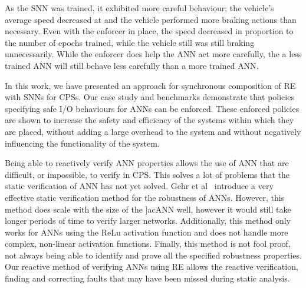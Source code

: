 As the \ac{SNN} was trained, it exhibited more careful behaviour; the vehicle's average speed decreased at and the vehicle performed more braking actions than necessary.
Even with the enforcer in place, the speed decreased in proportion to the number of epochs trained, while the vehicle still was still braking unnecessarily.
While the enforcer does help the \ac{ANN} act more carefully, the a less trained \ac{ANN} will still behave less carefully than a more trained \ac{ANN}.

In this work, we have presented an approach for synchronous composition of \acf{RE} with \acfp{SNN} for \acp{CPS}.
Our case study and benchmarks demonstrate that policies specifying safe I/O behaviours for \acp{ANN} can be enforced.
These enforced policies are shown to increase the safety and efficiency of the systems within which they are placed, without adding a large overhead to the system and without negatively influencing the functionality of the system.

Being able to reactively verify \ac{ANN} properties allows the use of \ac{ANN} that are difficult, or impossible, to verify in \ac{CPS}.
This solves a lot of problems that the static verification of \ac{ANN} has not yet solved.
Gehr et al~\cite{Gehr2018AI2SA} introduce a very effective static verification method for the robustness of \acp{ANN}.
However, this method does scale with the size of the ]ac{ANN} well, however it would still take longer periods of time to verify larger networks.
Additionally, this method only works for \acp{ANN} using the ReLu activation function and does not handle more complex, non-linear activation functions.
Finally, this method is not fool proof, not always being able to identify and prove all the specified robustness properties. 
Our reactive method of verifying \acp{ANN} using \ac{RE} allows the reactive verification, finding and correcting faults that may have been missed during static analysis.